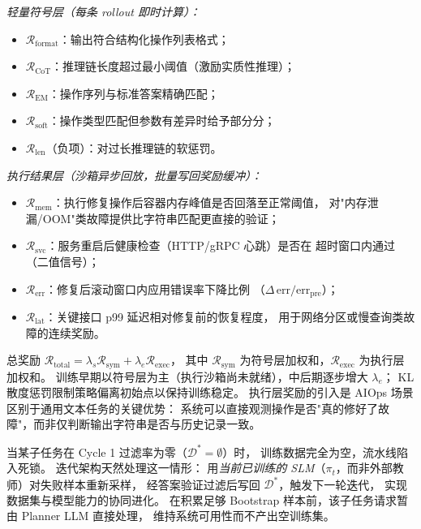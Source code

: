 \documentclass[lang=cn,a4paper,newtx,bibend=bibtex]{elegantpaper}
\begin{document}
\begin{description}[leftmargin=0pt, itemsep=6pt]
        \smallskip
        \noindent\textit{轻量符号层（每条 rollout 即时计算）：}
        \begin{itemize}[itemsep=1pt]
          \item $\mathcal{R}_{\mathrm{format}}$：输出符合结构化操作列表格式；
          \item $\mathcal{R}_{\mathrm{CoT}}$：推理链长度超过最小阈值（激励实质性推理）；
          \item $\mathcal{R}_{\mathrm{EM}}$：操作序列与标准答案精确匹配；
          \item $\mathcal{R}_{\mathrm{soft}}$：操作类型匹配但参数有差异时给予部分分；
          \item $\mathcal{R}_{\mathrm{len}}$（负项）：对过长推理链的软惩罚。
        \end{itemize}

        \noindent\textit{执行结果层（沙箱异步回放，批量写回奖励缓冲）：}
        \begin{itemize}[itemsep=1pt]
          \item $\mathcal{R}_{\mathrm{mem}}$：执行修复操作后容器内存峰值是否回落至正常阈值，
                对"内存泄漏/OOM"类故障提供比字符串匹配更直接的验证；
          \item $\mathcal{R}_{\mathrm{svc}}$：服务重启后健康检查（HTTP/gRPC 心跳）是否在
                超时窗口内通过（二值信号）；
          \item $\mathcal{R}_{\mathrm{err}}$：修复后滚动窗口内应用错误率下降比例
                （$\Delta\,\mathrm{err} / \mathrm{err}_{\mathrm{pre}}$）；
          \item $\mathcal{R}_{\mathrm{lat}}$：关键接口 p99 延迟相对修复前的恢复程度，
                用于网络分区或慢查询类故障的连续奖励。
        \end{itemize}

        总奖励 $\mathcal{R}_{\mathrm{total}} = \lambda_s \mathcal{R}_{\mathrm{sym}} + \lambda_e \mathcal{R}_{\mathrm{exec}}$，
        其中 $\mathcal{R}_{\mathrm{sym}}$ 为符号层加权和，$\mathcal{R}_{\mathrm{exec}}$ 为执行层加权和。
        训练早期以符号层为主（执行沙箱尚未就绪），中后期逐步增大 $\lambda_e$；
        KL 散度惩罚限制策略偏离初始点以保持训练稳定。
        执行层奖励的引入是 AIOps 场景区别于通用文本任务的关键优势：
        系统可以直接观测操作是否"真的修好了故障"，而非仅判断输出字符串是否与历史记录一致。

  \item[Bootstrap 回路——自举数据扩充。]
        当某子任务在 Cycle 1 过滤率为零（$\mathcal{D}^* = \emptyset$）时，
        训练数据完全为空，流水线陷入死锁。
        迭代架构天然处理这一情形：
        用\emph{当前已训练的 SLM}（$\pi_t$，而非外部教师）对失败样本重新采样，
        经答案验证过滤后写回 $\mathcal{D}^*$，触发下一轮迭代，
        实现数据集与模型能力的协同进化。
        在积累足够 Bootstrap 样本前，该子任务请求暂由 Planner LLM 直接处理，
        维持系统可用性而不产出空训练集。

\end{description}
\end{document}
